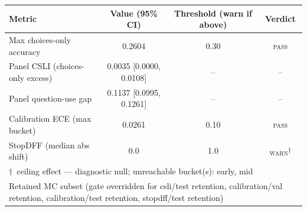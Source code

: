 \begin{tabular}{lccc}
\toprule
Metric & Value (95\% CI) & Threshold (warn if above) & Verdict \\
\midrule
Max choices-only accuracy & 0.2604 & 0.30 & \textsc{pass} \\
Panel CSLI (choices-only excess) & 0.0035 [0.0000, 0.0108] & -- & -- \\
Panel question-use gap & 0.1137 [0.0995, 0.1261] & -- & -- \\
Calibration ECE (max bucket) & 0.0261 & 0.10 & \textsc{pass} \\
StopDFF (median abs shift) & 0.0 & 1.0 & \textsc{warn}\textsuperscript{$\dagger$} \\
\bottomrule
\multicolumn{4}{l}{\footnotesize{$\dagger$\ ceiling effect — diagnostic null; unreachable bucket(s): early, mid}} \\
\multicolumn{4}{l}{\footnotesize{Retained MC subset (gate overridden for csli/test retention, calibration/val retention, calibration/test retention, stopdff/test retention)}} \\
\end{tabular}
